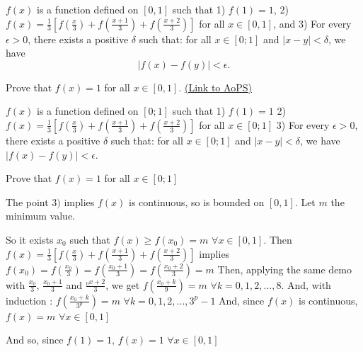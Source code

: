 \begin{problem}
	$ f(x)$ is a function defined on $ [0,1]$ such that
1) $ f(1)=1$,
2) $ f(x)=\frac{1}{3}[f(\frac{x}{3})+f(\frac{x+1}{3})+f(\frac{x+2}{3})]$ for all $ x \in [0,1]$, and
3) For every $ \epsilon>0$, there exists a positive $ \delta$ such that: for all $ x \in [0;1]$ and $ |x-y|<\delta$, we have 
$$ |f(x)-f(y)|<\epsilon.$$

Prove that $ f(x)=1$ for all $ x \in [0,1]$.
	\flushright \href{https://artofproblemsolving.com/community/c6h184003}{(Link to AoPS)}
\end{problem}



\begin{solution}
	\begin{tcolorbox}$ f(x)$ is a function defined on $ [0;1]$ such that
1) $ f(1) = 1$
2) $ f(x) = \frac {1}{3}[f(\frac {x}{3}) + f(\frac {x + 1}{3}) + f(\frac {x + 2}{3})]$ for all $ x \in [0;1]$
3) For every $ \epsilon > 0$, there exists a positive $ \delta$ such that: for all $ x \in [0;1]$ and $ |x - y| < \delta$, we have 
$ |f(x) - f(y)| < \epsilon$.

Prove that $ f(x) = 1$ for all $ x \in [0;1]$\end{tcolorbox}

The point $ 3)$ implies $ f(x)$ is continuous, so is bounded on $ [0,1]$. Let $ m$ the minimum value.

So it exists $ x_0$ such that $ f(x)\geq f(x_0)=m$ $ \forall x\in [0,1]$.
Then $ f(x) = \frac {1}{3}[f(\frac {x}{3}) + f(\frac {x + 1}{3}) + f(\frac {x + 2}{3})]$ implies $ f(x_0) = f(\frac {x_0}{3}) = f(\frac {x_0 + 1}{3}) = f(\frac {x_0 + 2}{3})=m$
Then, applying the same demo with $ \frac{x_0}{3}$,  $ \frac{x_0+1}{3}$ and  $ \frac{_0x+2}{3}$, we get $ f(\frac{x_0+k}{9})=m$ $ \forall k=0,1,2,...,8$.
And, with induction : $ f(\frac{x_0+k}{3^p})=m$ $ \forall k=0,1,2,...,3^p-1$
And, since $ f(x)$ is continuous, $ f(x)=m$ $ \forall x\in[0,1]$

And so, since $ f(1)=1$,  $ f(x)=1$ $ \forall x\in[0,1]$
\end{solution}



